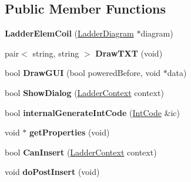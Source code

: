 \subsection*{Public Member Functions}
\begin{DoxyCompactItemize}
\item 
\hypertarget{class_ladder_elem_coil_afc4097323c943a8e43b21a7ae13f56fa}{{\bfseries Ladder\-Elem\-Coil} (\hyperlink{class_ladder_diagram}{Ladder\-Diagram} $\ast$diagram)}\label{class_ladder_elem_coil_afc4097323c943a8e43b21a7ae13f56fa}

\item 
\hypertarget{class_ladder_elem_coil_a7025841d963fea006eba83659a37a060}{pair$<$ string, string $>$ {\bfseries Draw\-T\-X\-T} (void)}\label{class_ladder_elem_coil_a7025841d963fea006eba83659a37a060}

\item 
\hypertarget{class_ladder_elem_coil_a6f8610f700c71ecff39c290005009d22}{bool {\bfseries Draw\-G\-U\-I} (bool powered\-Before, void $\ast$data)}\label{class_ladder_elem_coil_a6f8610f700c71ecff39c290005009d22}

\item 
\hypertarget{class_ladder_elem_coil_a70efa09fe043c1cb1f79623ea86d0e4f}{bool {\bfseries Show\-Dialog} (\hyperlink{struct_ladder_context}{Ladder\-Context} context)}\label{class_ladder_elem_coil_a70efa09fe043c1cb1f79623ea86d0e4f}

\item 
\hypertarget{class_ladder_elem_coil_a8b4ddc5a8a7c98049231f5bd73437ec9}{bool {\bfseries internal\-Generate\-Int\-Code} (\hyperlink{class_int_code}{Int\-Code} \&ic)}\label{class_ladder_elem_coil_a8b4ddc5a8a7c98049231f5bd73437ec9}

\item 
\hypertarget{class_ladder_elem_coil_a1cc313d369e046e6dcdfd464e634857f}{void $\ast$ {\bfseries get\-Properties} (void)}\label{class_ladder_elem_coil_a1cc313d369e046e6dcdfd464e634857f}

\item 
\hypertarget{class_ladder_elem_coil_ae8496d24dde35c746d7a162030f51a21}{bool {\bfseries Can\-Insert} (\hyperlink{struct_ladder_context}{Ladder\-Context} context)}\label{class_ladder_elem_coil_ae8496d24dde35c746d7a162030f51a21}

\item 
\hypertarget{class_ladder_elem_coil_aa694376d58d01dd6bae606bbda13b8d7}{void {\bfseries do\-Post\-Insert} (void)}\label{class_ladder_elem_coil_aa694376d58d01dd6bae606bbda13b8d7}


\end{DoxyCompactItemize}

